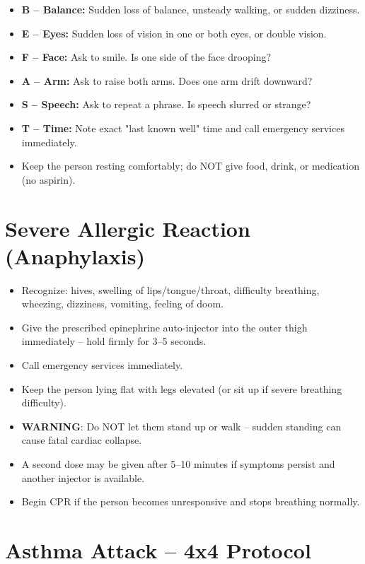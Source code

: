 \begin{itemize}[leftmargin=*]
\item \textbf{B -- Balance:} Sudden loss of balance, unsteady walking, or sudden dizziness.
\item \textbf{E -- Eyes:} Sudden loss of vision in one or both eyes, or double vision.
\item \textbf{F -- Face:} Ask to smile. Is one side of the face drooping?
\item \textbf{A -- Arm:} Ask to raise both arms. Does one arm drift downward?
\item \textbf{S -- Speech:} Ask to repeat a phrase. Is speech slurred or strange?
\item \textbf{T -- Time:} Note exact "last known well" time and call emergency services immediately.
\item Keep the person resting comfortably; do NOT give food, drink, or medication (no aspirin).
\end{itemize}

\section{Severe Allergic Reaction (Anaphylaxis)}

\begin{itemize}[leftmargin=*]
\item Recognize: hives, swelling of lips/tongue/throat, difficulty breathing, wheezing, dizziness, vomiting, feeling of doom.
\item Give the prescribed epinephrine auto-injector into the outer thigh immediately -- hold firmly for 3--5 seconds.
\item Call emergency services immediately.
\item Keep the person lying flat with legs elevated (or sit up if severe breathing difficulty).
\item \textbf{WARNING}: Do NOT let them stand up or walk -- sudden standing can cause fatal cardiac collapse.
\item A second dose may be given after 5--10 minutes if symptoms persist and another injector is available.
\item Begin CPR if the person becomes unresponsive and stops breathing normally.
\end{itemize}

\section{Asthma Attack -- 4x4 Protocol}

